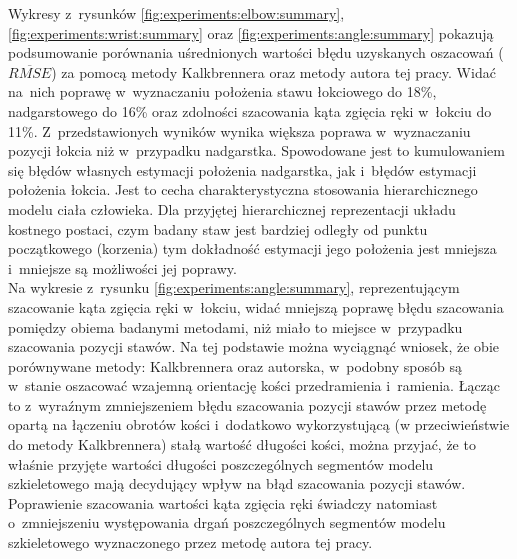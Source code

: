 Wykresy z~rysunków \ref{fig:experiments:elbow:summary}, \ref{fig:experiments:wrist:summary} oraz \ref{fig:experiments:angle:summary} pokazują podsumowanie porównania uśrednionych wartości błędu uzyskanych oszacowań ($\overline{RMSE}$) za pomocą metody Kalkbrennera oraz metody autora tej pracy.
Widać na~nich poprawę w~wyznaczaniu położenia stawu łokciowego do 18\%, nadgarstowego do 16\% oraz zdolności szacowania kąta zgięcia ręki w~łokciu do 11\%. Z~przedstawionych wyników wynika większa poprawa w~wyznaczaniu pozycji łokcia niż w~przypadku nadgarstka. Spowodowane jest to kumulowaniem się błędów własnych estymacji położenia nadgarstka, jak i~błędów estymacji położenia łokcia. Jest to cecha charakterystyczna stosowania hierarchicznego modelu ciała człowieka. Dla przyjętej hierarchicznej reprezentacji układu kostnego postaci, czym badany staw jest bardziej odległy od punktu początkowego (korzenia) tym dokładność estymacji jego położenia jest mniejsza i~mniejsze są możliwości jej poprawy.\\
																								
Na wykresie z~rysunku \ref{fig:experiments:angle:summary}, reprezentującym szacowanie kąta zgięcia ręki w~łokciu, widać mniejszą poprawę błędu szacowania pomiędzy obiema badanymi metodami, niż miało to miejsce w~przypadku szacowania pozycji stawów. Na tej podstawie można wyciągnąć wniosek, że obie porównywane metody: Kalkbrennera oraz autorska, w~podobny sposób są w~stanie oszacować wzajemną orientację kości przedramienia i~ramienia. Łącząc to z~wyraźnym zmniejszeniem błędu szacowania pozycji stawów przez metodę opartą na łączeniu obrotów kości i~dodatkowo wykorzystującą (w przeciwieństwie do metody Kalkbrennera) stałą wartość długości kości, można przyjać, że to właśnie przyjęte wartości długości poszczególnych segmentów modelu szkieletowego mają decydujący wpływ na błąd szacowania pozycji stawów. Poprawienie szacowania wartości kąta zgięcia ręki świadczy natomiast o~zmniejszeniu występowania drgań poszczególnych segmentów modelu szkieletowego wyznaczonego przez metodę autora tej pracy.
																								
